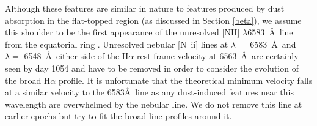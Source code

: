 \documentclass[useAMS,usenatbib,usegraphicx]{mnras}
\begin{document}
Although these features are similar in nature to features produced by dust absorption in the flat-topped region (as discussed in Section \ref{beta}), we assume this shoulder
to be the first appearance of the unresolved [NII] $\lambda$6583~\AA\ line from the equatorial ring \citep{Kozma1997}. 
Unresolved nebular [N~{\sc ii}] lines at $\lambda=$ 
6583~\AA\ and $\lambda=$ 6548~\AA\ either side of the H$\alpha$ rest frame
 velocity at 6563~\AA\ are certainly seen by day 1054 and have to be 
removed in order to consider the evolution of the broad H$\alpha$ profile. 
It is  unfortunate that the theoretical minimum velocity falls at 
a similar velocity to the 6583\AA\ line as any dust-induced features near this wavelength
 are overwhelmed by the nebular line.  We do not remove this line at earlier epochs but try to fit the broad line profiles around it.
 
\end{document}
